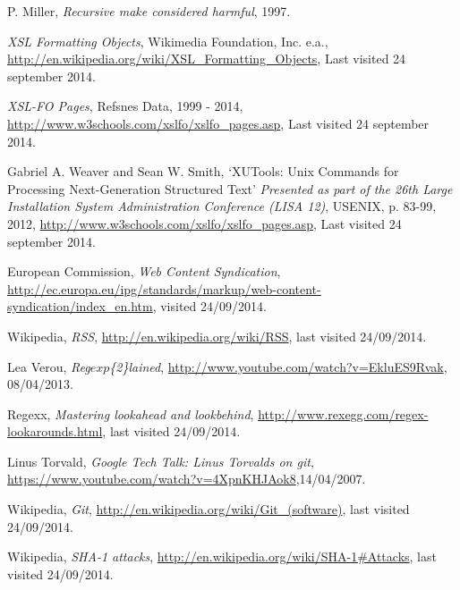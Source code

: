 \renewcommand{\bibname}{References}

\begin{thebibliography}{90}


  P. Miller,
  \emph{Recursive make considered harmful},
  1997.

  \emph{XSL Formatting Objects},
  Wikimedia Foundation, Inc. e.a., 
  \url{http://en.wikipedia.org/wiki/XSL\_Formatting\_Objects},
  Last visited 24 september 2014.

  \emph{XSL-FO Pages},
  Refsnes Data,
  1999 - 2014,
  \url{http://www.w3schools.com/xslfo/xslfo\_pages.asp},
  Last visited 24 september 2014.

  Gabriel A. Weaver and Sean W. Smith,
  `XUTools: Unix Commands for Processing Next-Generation Structured Text'
  \emph{Presented as part of the 26th Large Installation System Administration Conference (LISA 12)},
  USENIX,
  p. 83-99,
  2012,
  \url{http://www.w3schools.com/xslfo/xslfo\_pages.asp},
  Last visited 24 september 2014.
  
    European Commission, 
    \emph{Web Content Syndication},
    \url{http://ec.europa.eu/ipg/standards/markup/web-content-syndication/index\_en.htm}, visited 24/09/2014.
    
    Wikipedia,
    \emph{RSS},
    \url{http://en.wikipedia.org/wiki/RSS}, last visited 24/09/2014.

	Lea Verou,
	\emph{Reg\(exp\)\{2\}lained},
	\url{http://www.youtube.com/watch?v=EkluES9Rvak}, 08/04/2013.

    Regexx,
    \emph{Mastering lookahead and lookbehind},
	\url{http://www.rexegg.com/regex-lookarounds.html}, last visited 24/09/2014.

    Linus Torvald,
    \emph{Google Tech Talk: Linus Torvalds on git},
	\url{https://www.youtube.com/watch?v=4XpnKHJAok8},14/04/2007.
	
    Wikipedia,
    \emph{Git},
    \url{http://en.wikipedia.org/wiki/Git\_(software)}, last visited 24/09/2014.
    
    Wikipedia,
    \emph{SHA-1 attacks},
    \url{http://en.wikipedia.org/wiki/SHA-1#Attacks}, last visited 24/09/2014.

\end{thebibliography}
